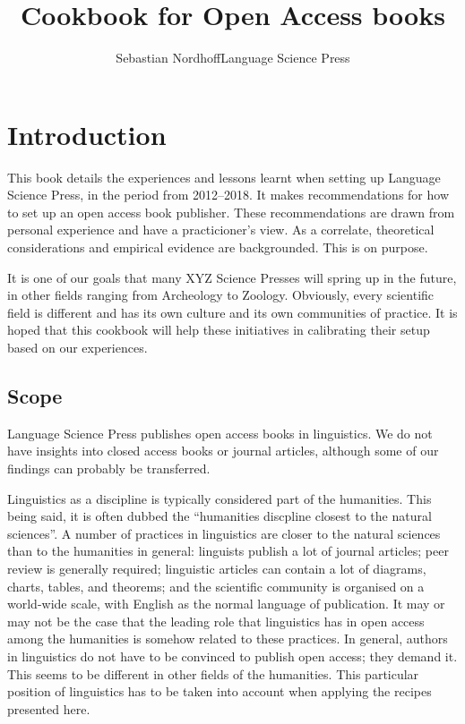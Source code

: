 \documentclass[output=guidelines,guidelines] {langscibook}
\title{Cookbook for Open Access books}
\author{Sebastian Nordhoff\newlineCover Language Science Press}
\begin{document}
\maketitle
\frontmatter 
\tableofcontents 
\mainmatter
\chapter{Introduction}
This book details the experiences and lessons learnt when setting up Language Science Press, in the period from 2012--2018. It makes recommendations for how to set up an open access book publisher. These recommendations are drawn from personal experience and have a practicioner's view. As a correlate, theoretical considerations and empirical evidence are backgrounded. This is on purpose. 

It is one of our goals that many XYZ Science Presses will spring up in the future, in other fields ranging from Archeology to Zoology. Obviously, every scientific field is different and has its own culture and its own communities of practice. It is hoped that this cookbook will help these initiatives in calibrating their setup based on our experiences. 

\section{Scope}
Language Science Press publishes open access books in linguistics. We do not have insights into closed access books or journal articles, although some of our findings can probably be transferred. 

Linguistics as a discipline is typically considered part of the humanities. This being said, it is often dubbed the ``humanities discpline closest to the natural sciences''. A number of practices in linguistics are closer to the natural sciences than to the humanities in general: linguists publish a lot of journal articles; peer review is generally required; linguistic articles can contain a lot of diagrams, charts, tables, and theorems; and the scientific community is organised on a world-wide scale, with English as the normal language of publication. It may or may not be the case that the leading role that linguistics has in open access among the humanities is somehow related to these practices. In general, authors in linguistics do not have to be convinced to publish open access; they demand it. This seems to be different in other fields of the humanities. This particular position of linguistics has to be taken into account when applying the recipes presented here. 
\end{document}
